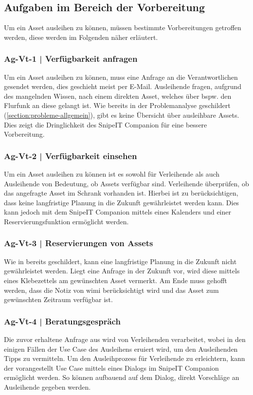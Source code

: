 \subsection{Aufgaben im Bereich der Vorbereitung}
Um ein Asset ausleihen zu können, müssen bestimmte Vorbereitungen getroffen werden, diese werden im
Folgenden näher erläutert.
\subsubsection{Ag-Vt-1 | Verfügbarkeit anfragen}
\label{subsubsec:Ag-Vt-1}
Um ein Asset ausleihen zu können, muss eine Anfrage an die Verantwortlichen gesendet werden, dies
geschieht meist per E-Mail. Ausleihende fragen, aufgrund des mangelnden Wissen, nach einem direkten
Asset, welches über bspw. den Flurfunk an diese gelangt ist. Wie bereits in der Problemanalyse
geschildert (\ref{section:probleme-allgemein}), gibt es keine Übersicht über ausleihbare Assets.
Dies zeigt die Dringlichkeit des SnipeIT Companion für eine bessere Vorbereitung.
\subsubsection{Ag-Vt-2 | Verfügbarkeit einsehen}
\label{subsubsection:Ag-Vt-2}
Um ein Asset ausleihen zu können ist es sowohl für Verleihende als auch Ausleihende von Bedeutung,
ob Assets verfügbar sind. Verleihende überprüfen, ob das angefragte Asset im Schrank vorhanden ist.
Hierbei ist zu berücksichtigen, dass keine langfristige Planung in die Zukunft gewährleistet werden
kann. Dies kann jedoch mit dem SnipeIT Companion mittels eines Kalenders und einer
Reservierungsfunktion ermöglicht werden.
\subsubsection{Ag-Vt-3 | Reservierungen von Assets}
\label{subsubsection:Ag-Vt-3}
Wie in \textit{} bereits geschildert, kann eine langfristige Planung in die
Zukunft nicht gewährleistet werden. Liegt eine Anfrage in der Zukunft vor, wird diese mittels eines
Klebezettels am gewünschten Asset vermerkt. Am Ende muss gehofft werden, dass die Notiz von
\ac{wimi} berücksichtigt wird und das Asset zum gewünschten Zeitraum verfügbar ist.
\subsubsection{Ag-Vt-4 | Beratungsgespräch}
\label{subsubsection:Ag-Vt-4}
Die zuvor erhaltene Anfrage aus \textit{} wird von Verleihenden
verarbeitet, wobei in den einigen Fällen der Use Case des Ausleihens eruiert wird, um den
Ausleihenden Tipps zu vermitteln. Um den Ausleihprozess für Verleihende zu erleichtern, kann der
vorangestellt Use Case mittels eines Dialogs im SnipeIT Companion ermöglicht werden. So können
aufbauend auf dem Dialog, direkt Vorschläge an Ausleihende gegeben werden.



